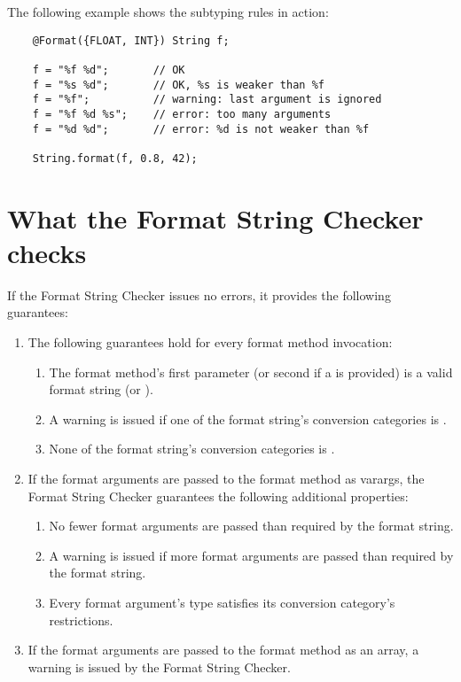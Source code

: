The following example shows the subtyping rules in action:

\begin{Verbatim}
    @Format({FLOAT, INT}) String f;

    f = "%f %d";       // OK
    f = "%s %d";       // OK, %s is weaker than %f
    f = "%f";          // warning: last argument is ignored
    f = "%f %d %s";    // error: too many arguments
    f = "%d %d";       // error: %d is not weaker than %f

    String.format(f, 0.8, 42);
\end{Verbatim}

\section{What the Format String Checker checks\label{formatter-guarantees}}

If the Format String Checker issues no errors, it provides the following guarantees:

\begin{enumerate}
\item
The following guarantees hold for every format method invocation:

\begin{enumerate}
    \item The format method's first parameter (or second if a  is provided) is a valid
        format string (or ).

    \item A warning is issued if one of the format string's conversion categories is .
        \label{formatter-unused-category-warning}
    \item None of the format string's conversion categories is .
        \label{formatter-null-category-error}
\end{enumerate}

\item If the format arguments are passed to the format method as varargs, the
Format String Checker guarantees the following additional properties:

\begin{enumerate}
\item No fewer format arguments are passed than required by the format string.
\item A warning is issued if more format arguments are passed than required by the format string.
\item Every format argument's type satisfies its conversion category's restrictions.
\end{enumerate}

\item If the format arguments are passed to the format method as an array,
a warning is issued by the Format String Checker.
        \label{formatter-array-warning}
\end{enumerate}


